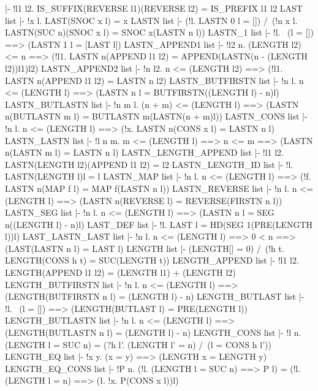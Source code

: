 |- !l1 l2. IS_SUFFIX(REVERSE l1)(REVERSE l2) = IS_PREFIX l1 l2
\ENDTHEOREM
\THEOREM LAST list
|- !x l. LAST(SNOC x l) = x
\ENDTHEOREM
\THEOREM LASTN list
|- (!l. LASTN 0 l = []) /\
   (!n x l. LASTN(SUC n)(SNOC x l) = SNOC x(LASTN n l))
\ENDTHEOREM
\THEOREM LASTN\_1 list
|- !l. ~(l = []) ==> (LASTN 1 l = [LAST l])
\ENDTHEOREM
\THEOREM LASTN\_APPEND1 list
|- !l2 n.
    (LENGTH l2) <= n ==>
    (!l1. LASTN n(APPEND l1 l2) = APPEND(LASTN(n - (LENGTH l2))l1)l2)
\ENDTHEOREM
\THEOREM LASTN\_APPEND2 list
|- !n l2. n <= (LENGTH l2) ==> (!l1. LASTN n(APPEND l1 l2) = LASTN n l2)
\ENDTHEOREM
\THEOREM LASTN\_BUTFIRSTN list
|- !n l. n <= (LENGTH l) ==> (LASTN n l = BUTFIRSTN((LENGTH l) - n)l)
\ENDTHEOREM
\THEOREM LASTN\_BUTLASTN list
|- !n m l.
    (n + m) <= (LENGTH l) ==>
    (LASTN n(BUTLASTN m l) = BUTLASTN m(LASTN(n + m)l))
\ENDTHEOREM
\THEOREM LASTN\_CONS list
|- !n l. n <= (LENGTH l) ==> (!x. LASTN n(CONS x l) = LASTN n l)
\ENDTHEOREM
\THEOREM LASTN\_LASTN list
|- !l n m.
    m <= (LENGTH l) ==> n <= m ==> (LASTN n(LASTN m l) = LASTN n l)
\ENDTHEOREM
\THEOREM LASTN\_LENGTH\_APPEND list
|- !l1 l2. LASTN(LENGTH l2)(APPEND l1 l2) = l2
\ENDTHEOREM
\THEOREM LASTN\_LENGTH\_ID list
|- !l. LASTN(LENGTH l)l = l
\ENDTHEOREM
\THEOREM LASTN\_MAP list
|- !n l. n <= (LENGTH l) ==> (!f. LASTN n(MAP f l) = MAP f(LASTN n l))
\ENDTHEOREM
\THEOREM LASTN\_REVERSE list
|- !n l. n <= (LENGTH l) ==> (LASTN n(REVERSE l) = REVERSE(FIRSTN n l))
\ENDTHEOREM
\THEOREM LASTN\_SEG list
|- !n l. n <= (LENGTH l) ==> (LASTN n l = SEG n((LENGTH l) - n)l)
\ENDTHEOREM
\THEOREM LAST\_DEF list
|- !l. LAST l = HD(SEG 1(PRE(LENGTH l))l)
\ENDTHEOREM
\THEOREM LAST\_LASTN\_LAST list
|- !n l. n <= (LENGTH l) ==> 0 < n ==> (LAST(LASTN n l) = LAST l)
\ENDTHEOREM
\THEOREM LENGTH list
|- (LENGTH[] = 0) /\ (!h t. LENGTH(CONS h t) = SUC(LENGTH t))
\ENDTHEOREM
\THEOREM LENGTH\_APPEND list
|- !l1 l2. LENGTH(APPEND l1 l2) = (LENGTH l1) + (LENGTH l2)
\ENDTHEOREM
\THEOREM LENGTH\_BUTFIRSTN list
|- !n l. n <= (LENGTH l) ==> (LENGTH(BUTFIRSTN n l) = (LENGTH l) - n)
\ENDTHEOREM
\THEOREM LENGTH\_BUTLAST list
|- !l. ~(l = []) ==> (LENGTH(BUTLAST l) = PRE(LENGTH l))
\ENDTHEOREM
\THEOREM LENGTH\_BUTLASTN list
|- !n l. n <= (LENGTH l) ==> (LENGTH(BUTLASTN n l) = (LENGTH l) - n)
\ENDTHEOREM
\THEOREM LENGTH\_CONS list
|- !l n.
    (LENGTH l = SUC n) = (?h l'. (LENGTH l' = n) /\ (l = CONS h l'))
\ENDTHEOREM
\THEOREM LENGTH\_EQ list
|- !x y. (x = y) ==> (LENGTH x = LENGTH y)
\ENDTHEOREM
\THEOREM LENGTH\_EQ\_CONS list
|- !P n.
    (!l. (LENGTH l = SUC n) ==> P l) =
    (!l. (LENGTH l = n) ==> (\l. !x. P(CONS x l))l)
\ENDTHEOREM
